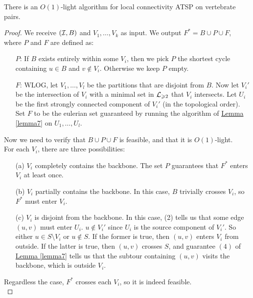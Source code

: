 \documentclass[./main.tex]{subfiles}
\begin{document}
		\begin{theorem}
			There is an $O(1)$-light algorithm for local connectivity ATSP on vertebrate pairs.
		\end{theorem}
		\begin{proof}
			We receive $(\mathcal{I},B)$ and $V_1,\ldots,V_k$ as input. We output $F^*=B\cup P\cup F$, where $P$ and $F$ are defined as:
			
			\begin{enumerate}
				\item[$P$:] If $B$ exists entirely within some $V_i$, then we pick $P$ the shortest cycle containing $u\in B$ and $v\notin V_i$. Otherwise we keep $P$ empty.
				\item[$F$:] WLOG, let $V_1,\ldots,V_l$ be the partitions that are disjoint from $B$. Now let $V_i'$ be the intersection of $V_i$ with a minimal set in $\mathcal{L}_{\geqslant 2}$ that $V_i$ intersects. Let $U_i$ be the first strongly connected component of $V_i'$ (in the topological order). Set $F$ to be the eulerian set guaranteed by running the algorithm of \hyperref[lemma7]{Lemma \ref{lemma7}} on $U_1,\ldots,U_l$.\\
			\end{enumerate}\vspace{2mm}
			
			Now we need to verify that $B\cup P\cup F$ is feasible, and that it is $O(1)$-light.\\
			
			For each $V_i$, there are three possibilities:
			\begin{enumerate}
				\item[(a)] $V_i$ completely contains the backbone. The set $P$ guarantees that $F^*$ enters $V_i$ at least once.
				\item[(b)] $V_i$ partially contains the backbone. In this case, $B$ trivially crosses $V_i$, so $F^*$ must enter $V_i$.
				\item[(c)] $V_i$ is disjoint from the backbone. In this case, (2) tells us that some edge $(u,v)$ must enter $U_i$. $u\notin V_i'$ since $U_i$ is the source component of $V_i'$. So either $u\in S\setminus V_i$ or $u\notin S$. If the former is true, then $(u,v)$ enters $V_i$ from outside. If the latter is true, then $(u,v)$ crosses $S$, and guarantee $(4)$ of \hyperref[lemma7]{Lemma \ref{lemma7}} tells us that the subtour containing $(u,v)$ visits the backbone, which is outside $V_i$.
			\end{enumerate}
			
			Regardless the case, $F^*$ crosses each $V_i$, so it is indeed feasible.\\\vspace{2mm}
			

\end{proof}
\end{document}
